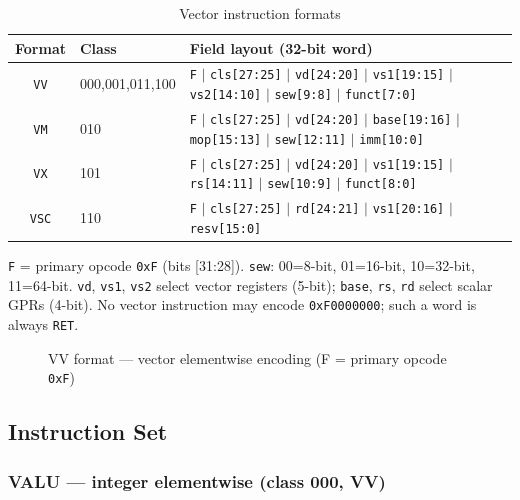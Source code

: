 \documentclass[11pt,a4paper]{article}
\begin{document}
\begin{table}[H]
\centering
\caption{Vector instruction formats}
\footnotesize
\begin{tabular}{clp{10cm}}
\toprule
Format & Class & Field layout (32-bit word) \\
\midrule
{\tt VV} & 000,001,011,100 & {\tt F} $\mid$ {\tt cls[27:25]} $\mid$ {\tt vd[24:20]} $\mid$ {\tt vs1[19:15]} $\mid$ {\tt vs2[14:10]} $\mid$ {\tt sew[9:8]} $\mid$ {\tt funct[7:0]} \\
{\tt VM} & 010 & {\tt F} $\mid$ {\tt cls[27:25]} $\mid$ {\tt vd[24:20]} $\mid$ {\tt base[19:16]} $\mid$ {\tt mop[15:13]} $\mid$ {\tt sew[12:11]} $\mid$ {\tt imm[10:0]} \\
{\tt VX} & 101 & {\tt F} $\mid$ {\tt cls[27:25]} $\mid$ {\tt vd[24:20]} $\mid$ {\tt vs1[19:15]} $\mid$ {\tt rs[14:11]} $\mid$ {\tt sew[10:9]} $\mid$ {\tt funct[8:0]} \\
{\tt VSC} & 110 & {\tt F} $\mid$ {\tt cls[27:25]} $\mid$ {\tt rd[24:21]} $\mid$ {\tt vs1[20:16]} $\mid$ {\tt resv[15:0]} \\
\bottomrule
\end{tabular}
\end{table}

{\tt F} = primary opcode {\tt 0xF} (bits [31:28]). {\tt sew}: 00=8-bit,
01=16-bit, 10=32-bit, 11=64-bit. {\tt vd}, {\tt vs1}, {\tt vs2} select
vector registers (5-bit); {\tt base}, {\tt rs}, {\tt rd} select scalar GPRs
(4-bit). No vector instruction may encode {\tt 0xF0000000}; such a word is
always {\tt RET}.

\begin{figure}[H]
\centering
{}
\caption{VV format --- vector elementwise encoding (F = primary opcode {\tt 0xF})}
\end{figure}

\subsection{Instruction Set}

\subsubsection*{VALU --- integer elementwise (class 000, VV)}
\end{document}
